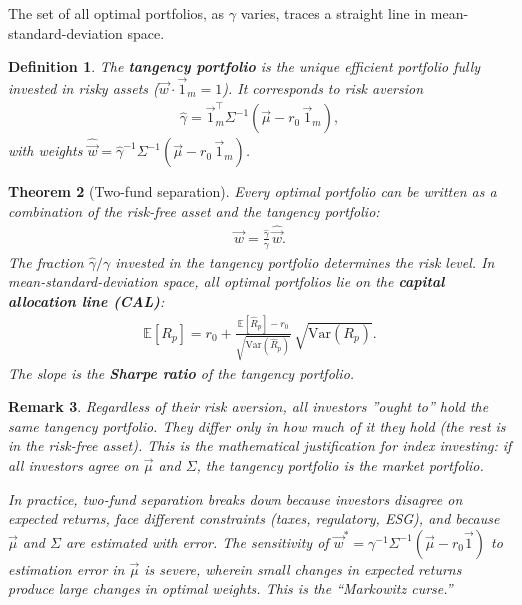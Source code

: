 \documentclass{report}
\theoremstyle{spacedplain}
\newtheorem{theorem}{Theorem}[section]
\theoremstyle{spaceddefinition}
\newtheorem{definition}[theorem]{Definition}
\theoremstyle{spacedremark}
\newtheorem{remark}[theorem]{Remark}
\begin{document}
The set of all optimal portfolios, as $\gamma$ varies, traces a straight line in mean-standard-deviation space.

\begin{definition}
The \textbf{tangency portfolio} is the unique efficient portfolio fully invested in risky assets ($\vec{w} \cdot \vec{1}_m = 1$). It corresponds to risk aversion
\begin{align}
    \hat{\gamma} = \vec{1}_m^\top \Sigma^{-1}(\vec{\mu} - r_0\,\vec{1}_m),
\end{align}
with weights $\hat{\vec{w}} = \hat{\gamma}^{-1}\Sigma^{-1}(\vec{\mu} - r_0\,\vec{1}_m)$.
\end{definition}

\begin{theorem}[Two-fund separation]
Every optimal portfolio can be written as a combination of the risk-free asset and the tangency portfolio:
\begin{align}
    \vec{w} = \frac{\hat{\gamma}}{\gamma}\,\hat{\vec{w}}.
\end{align}
The fraction $\hat{\gamma}/\gamma$ invested in the tangency portfolio determines the risk level. In mean-standard-deviation space, all optimal portfolios lie on the \textbf{capital allocation line (CAL)}:
\begin{align}
    \mathbb{E}[R_p] = r_0 + \frac{\mathbb{E}[\hat{R}_p] - r_0}{\sqrt{\text{Var}(\hat{R}_p)}}\,\sqrt{\text{Var}(R_p)}.
\end{align}
The slope is the \textbf{Sharpe ratio} of the tangency portfolio.
\end{theorem}

\begin{remark}
Regardless of their risk aversion, all investors ''ought to'' hold the same tangency portfolio. They differ only in how much of it they hold (the rest is in the risk-free asset). This is the mathematical justification for index investing: if all investors agree on $\vec{\mu}$ and $\Sigma$, the tangency portfolio is the market portfolio.

In practice, two-fund separation breaks down because investors disagree on expected returns, face different constraints (taxes, regulatory, ESG), and because $\vec{\mu}$ and $\Sigma$ are estimated with error. The sensitivity of $\vec{w}^* = \gamma^{-1}\Sigma^{-1}(\vec{\mu} - r_0\vec{1})$ to estimation error in $\vec{\mu}$ is severe, wherein small changes in expected returns produce large changes in optimal weights. This is the ``Markowitz curse.''
\end{remark}
\end{document}
